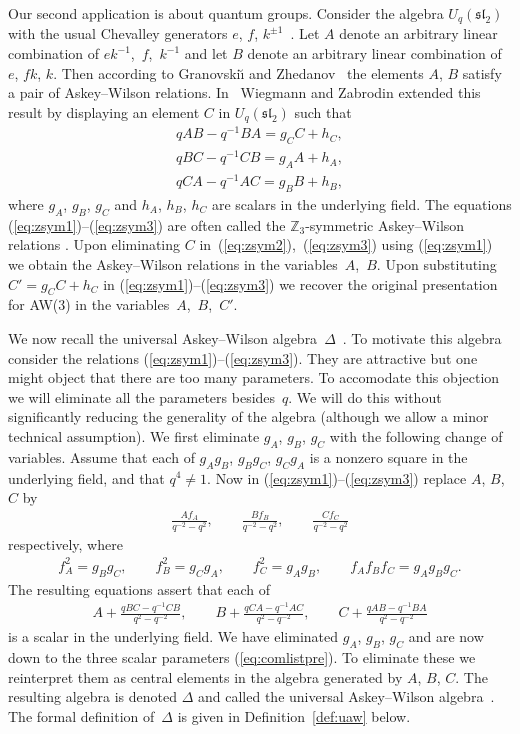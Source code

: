 \documentclass[pdftex]{sigma}
\numberwithin{equation}{section}
\begin{document}
Our second application is about quantum groups.
Consider the algebra
$U_q(\mathfrak{sl}_2)$
with the usual Chevalley generators
$e$, $f$, $k^{\pm 1}$~\cite{jantzen}.
Let $A$ denote an arbitrary
linear combination of $ek^{-1}$,~$f$,~$k^{-1}$ and let $B$ denote
 an arbitrary linear
combination of $e$, $fk$,  $k$. Then according to
   Granovski{\u\i} and Zhedanov~\cite{GYZlinear}
the elements $A$, $B$ satisfy
a pair of Askey--Wilson relations.
In~\cite{wz} Wiegmann and Zabrodin
extended this result by
displaying an element
$C$ in
$U_q(\mathfrak{sl}_2)$
such that
\begin{gather}
qAB-q^{-1}BA  =  g_C C + h_C,
\label{eq:zsym1}
\\
qBC-q^{-1}CB  =  g_A A + h_A,
\label{eq:zsym2}
\\
qCA-q^{-1}AC  =  g_B B + h_B,
\label{eq:zsym3}
\end{gather}
where $g_A$, $g_B$, $g_C$ and $h_A$, $h_B$, $h_C$
are scalars in the underlying f\/ield.
The equations
(\ref{eq:zsym1})--(\ref{eq:zsym3})
are often called the
$\mathbb Z_3$-symmetric Askey--Wilson relations
\cite{dahater}.
Upon eliminating $C$ in~(\ref{eq:zsym2}),~(\ref{eq:zsym3}) using
(\ref{eq:zsym1}) we obtain the Askey--Wilson relations
in the variables~$A$,~$B$. Upon substituting
$C'=g_C C + h_C$ in
(\ref{eq:zsym1})--(\ref{eq:zsym3}) we recover the
original presentation for AW(3) in the variables~$A$,~$B$,~$C'$.


We now recall the universal
Askey--Wilson algebra~$\Delta$~\cite{uaw}.
To motivate this algebra
consider the
relations
(\ref{eq:zsym1})--(\ref{eq:zsym3}). They
are attractive but one might object that
there are too many parameters.
To accomodate this objection
we will
eliminate
all the parameters besides~$q$.
We will do this
without
signif\/icantly reducing
the generality of the algebra
(although
we allow a minor technical assumption).
We f\/irst eliminate
 $g_A$, $g_B$, $g_C$ with the following
 change of variables.
Assume that
each of $g_Ag_B$, $g_Bg_C$, $g_Cg_A$ is a nonzero
square in the underlying f\/ield, and that $q^4\not=1$.
Now in
(\ref{eq:zsym1})--(\ref{eq:zsym3})
 replace $A$, $B$, $C$ by
\begin{gather*}
\frac{A f_A}{q^{-2}-q^2},
\qquad
\frac{B f_B}{q^{-2}-q^2},
\qquad
\frac{C f_C}{q^{-2}-q^2}
\end{gather*}
respectively, where
\begin{gather*}
f^2_A=g_B g_C,
\qquad
f^2_B=g_C g_A,
\qquad
f^2_C=g_A g_B,
\qquad
f_A f_B f_C =g_A g_B g_C.
\end{gather*}
The resulting equations assert that each of
\begin{gather}
 A+ \frac{qBC-q^{-1}CB}{q^2-q^{-2}},
\qquad B+
\frac{qCA-q^{-1}AC}{q^2-q^{-2}},
\qquad
C+
\frac{qAB-q^{-1}BA}{q^2-q^{-2}}
\label{eq:comlistpre}
\end{gather}
is a scalar in the underlying f\/ield.
We have eliminated
$g_A$, $g_B$, $g_C$ and are now
down to the three scalar parameters
(\ref{eq:comlistpre}).
To eliminate these we reinterpret them
as central elements in the algebra generated by
$A$, $B$, $C$. The resulting algebra is denoted $\Delta$
and called the
 universal Askey--Wilson algebra~\cite{uaw}.
The formal def\/inition of~$\Delta$
is given in Def\/inition~\ref{def:uaw} below.
\end{document}
